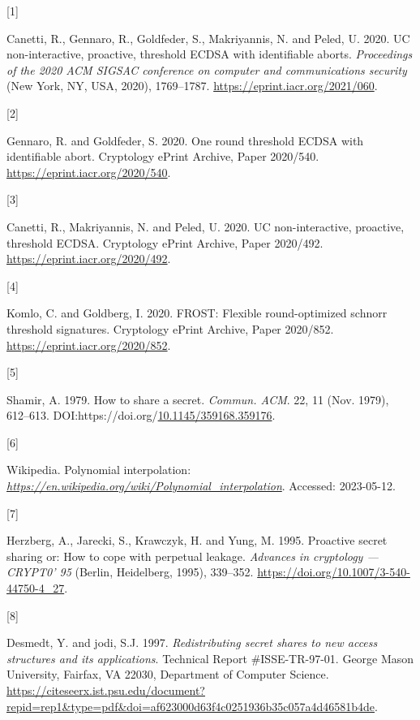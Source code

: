 \documentclass[
]{article}
\newlength{\cslhangindent}
\newlength{\csllabelwidth}
\newlength{\cslentryspacingunit} %
\newenvironment{CSLReferences}[2] %
 {%
  \setlength{\parindent}{0pt}
  \ifodd #1
  \let\oldpar\par
  \def\par{\hangindent=\cslhangindent\oldpar}
  \fi
  \setlength{\parskip}{#2\cslentryspacingunit}
 }%
 {}
\newcommand{\CSLLeftMargin}[1]{\parbox[t]{\csllabelwidth}{#1}}
\newcommand{\CSLRightInline}[1]{\parbox[t]{\linewidth - \csllabelwidth}{#1}\break}
\begin{document}
\hypertarget{refs}{}
\begin{CSLReferences}{0}{0}
\leavevmode{}%
\CSLLeftMargin{{[}1{]} }%
\CSLRightInline{Canetti, R., Gennaro, R., Goldfeder, S., Makriyannis, N.
and Peled, U. 2020. UC non-interactive, proactive, threshold ECDSA with
identifiable aborts. \emph{Proceedings of the 2020 ACM SIGSAC conference
on computer and communications security} (New York, NY, USA, 2020),
1769--1787. \url{https://eprint.iacr.org/2021/060}.}

\leavevmode{}%
\CSLLeftMargin{{[}2{]} }%
\CSLRightInline{Gennaro, R. and Goldfeder, S. 2020. One round threshold
ECDSA with identifiable abort. Cryptology ePrint Archive, Paper
2020/540. \url{https://eprint.iacr.org/2020/540}.}

\leavevmode{}%
\CSLLeftMargin{{[}3{]} }%
\CSLRightInline{Canetti, R., Makriyannis, N. and Peled, U. 2020. UC
non-interactive, proactive, threshold ECDSA. Cryptology ePrint Archive,
Paper 2020/492. \url{https://eprint.iacr.org/2020/492}.}

\leavevmode{}%
\CSLLeftMargin{{[}4{]} }%
\CSLRightInline{Komlo, C. and Goldberg, I. 2020. FROST: Flexible
round-optimized schnorr threshold signatures. Cryptology ePrint Archive,
Paper 2020/852. \url{https://eprint.iacr.org/2020/852}.}

\leavevmode{}%
\CSLLeftMargin{{[}5{]} }%
\CSLRightInline{Shamir, A. 1979. How to share a secret. \emph{Commun.
ACM}. 22, 11 (Nov. 1979), 612--613.
DOI:https://doi.org/\href{https://doi.org/10.1145/359168.359176}{10.1145/359168.359176}.}

\leavevmode{}%
\CSLLeftMargin{{[}6{]} }%
\CSLRightInline{Wikipedia. Polynomial interpolation:
\href{https://en.wikipedia.org/wiki/Polynomial_interpolation}{\emph{https://en.wikipedia.org/wiki/Polynomial\_interpolation}}.
Accessed: 2023-05-12.}

\leavevmode{}%
\CSLLeftMargin{{[}7{]} }%
\CSLRightInline{Herzberg, A., Jarecki, S., Krawczyk, H. and Yung, M.
1995. Proactive secret sharing or: How to cope with perpetual leakage.
\emph{Advances in cryptology --- CRYPT0' 95} (Berlin, Heidelberg, 1995),
339--352. \url{https://doi.org/10.1007/3-540-44750-4_27}.}

\leavevmode{}%
\CSLLeftMargin{{[}8{]} }%
\CSLRightInline{Desmedt, Y. and jodi, S.J. 1997. \emph{Redistributing
secret shares to new access structures and its applications}. Technical
Report \#ISSE-TR-97-01. George Mason University, Fairfax, VA 22030,
Department of Computer Science.
\url{https://citeseerx.ist.psu.edu/document?repid=rep1\&type=pdf\&doi=af623000d63f4c0251936b35c057a4d46581b4de}.}


\end{CSLReferences}
\end{document}
